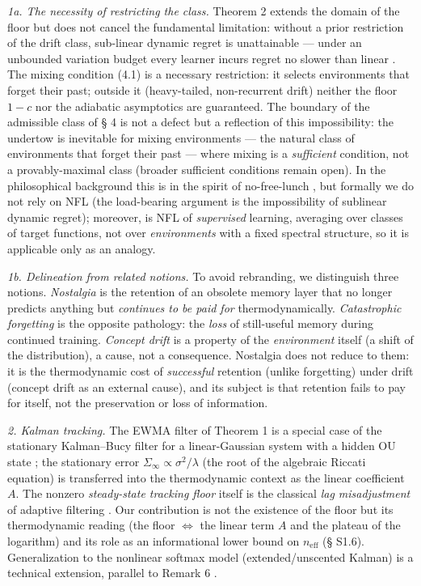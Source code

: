 \documentclass[12pt]{iopart}
\begin{document}
\emph{1a. The necessity of restricting the class.} Theorem 2 extends the domain of the floor but does not cancel the fundamental limitation: without a prior restriction of the drift class, sub-linear dynamic regret is unattainable --- under an unbounded variation budget every learner incurs regret no slower than linear \cite{BesbesGurZeevi2015,Zinkevich2003}. The mixing condition (4.1) is a necessary restriction: it selects environments that forget their past; outside it (heavy-tailed, non-recurrent drift) neither the floor \(1-c\) nor the adiabatic asymptotics are guaranteed. The boundary of the admissible class of § 4 is not a defect but a reflection of this impossibility: the undertow is inevitable for mixing environments --- the natural class of environments that forget their past --- where mixing is a \emph{sufficient} condition, not a provably-maximal class (broader sufficient conditions remain open). In the philosophical background this is in the spirit of no-free-lunch \cite{Wolpert1996}, but formally we do not rely on NFL (the load-bearing argument is the impossibility of sublinear dynamic regret); moreover, \cite{Wolpert1996} is NFL of \emph{supervised} learning, averaging over classes of target functions, not over \emph{environments} with a fixed spectral structure, so it is applicable only as an analogy.



\emph{1b. Delineation from related notions.} To avoid rebranding, we distinguish three notions. \emph{Nostalgia} is the retention of an obsolete memory layer that no longer predicts anything but \emph{continues to be paid for} thermodynamically. \emph{Catastrophic forgetting} \cite{McCloskeyCohen1989,Kirkpatrick2017} is the opposite pathology: the \emph{loss} of still-useful memory during continued training. \emph{Concept drift} \cite{Gama2014} is a property of the \emph{environment} itself (a shift of the distribution), a cause, not a consequence. Nostalgia does not reduce to them: it is the thermodynamic cost of \emph{successful} retention (unlike forgetting) under drift (concept drift as an external cause), and its subject is that retention fails to pay for itself, not the preservation or loss of information.



\emph{2. Kalman tracking.} The EWMA filter of Theorem 1 is a special case of the stationary Kalman--Bucy filter for a linear-Gaussian system with a hidden OU state \cite{KalmanBucy1961,AndersonMoore1979}; the stationary error \(\Sigma_\infty \propto \sigma^2/\lambda\) (the root of the algebraic Riccati equation) is transferred into the thermodynamic context as the linear coefficient \(A\). The nonzero \emph{steady-state tracking floor} itself is the classical \emph{lag misadjustment} of adaptive filtering \cite{Widrow1976,Haykin2014}. Our contribution is not the existence of the floor but its thermodynamic reading (the floor \(\Leftrightarrow\) the linear term \(A\) and the plateau of the logarithm) and its role as an informational lower bound on \(n_{\text{eff}}\) (§ S1.6). Generalization to the nonlinear softmax model (extended/unscented Kalman) is a technical extension, parallel to Remark 6 \cite{Andriishin2026b}.
\end{document}
